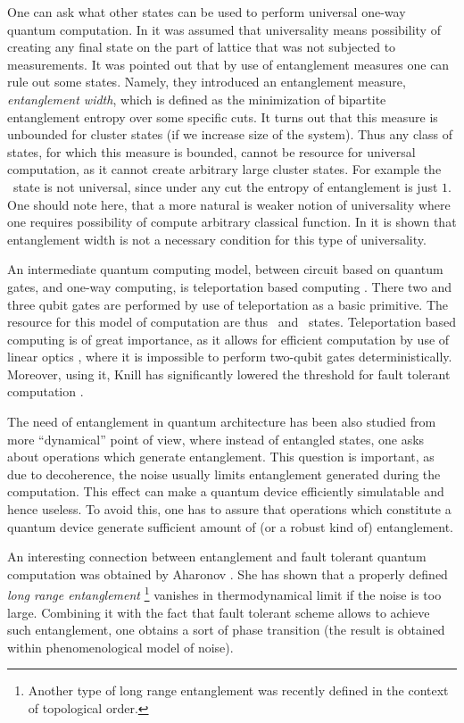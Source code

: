 \documentclass[rmp,12pt,preprint]{revtex4-2}
\begin{document}
One can ask what other states can be used to perform universal
one-way quantum computation. In \cite{NestMDB2006-one-way-resource}
it was assumed that universality means possibility
of creating any final state on the part of lattice that
was not subjected to measurements.
It was pointed out that by use of entanglement measures one can
rule out some states. Namely, they introduced an entanglement
measure, {\it entanglement width}, which is defined as the
minimization of bipartite entanglement entropy over some specific
cuts. It turns out that this measure is unbounded for cluster states
(if we increase size of the system). Thus any class of
states, for which this measure is bounded, cannot be resource for
universal computation, as it cannot create arbitrary large cluster
states. For example the \ghz\ state is not universal, since under
any cut the entropy of entanglement is just $1$.
One should note here, that a more natural is weaker notion of universality
where one requires possibility of compute arbitrary classical function. In \cite{GrossE2006-one-way}
it is shown that entanglement width is not a necessary condition
for this type of universality.

An intermediate quantum computing model, between circuit based on
quantum gates, and one-way computing, is teleportation based
computing \cite{GottesmanC1999-Knill}. There two and three
qubit gates are performed by use of teleportation as a basic
primitive. The resource for this model of computation are thus
\eprstates\ and \ghz\ states. Teleportation based computing is of
great importance, as it allows for efficient computation by use of
linear optics \cite{KnillLM2001-lin-opt}, where it is impossible to
perform two-qubit gates
deterministically. Moreover, using it, Knill has significantly
lowered the threshold for fault tolerant computation
\cite{Knill-FT}.

The need of entanglement in quantum architecture has been also studied
from more ``dynamical'' point of view, where instead of entangled
states, one asks about operations which generate entanglement. This
question is important, as due to decoherence, the noise usually limits
entanglement generated during the computation. This effect can make a
quantum device efficiently simulatable and hence useless. To avoid
this, one has to assure that operations which constitute a quantum
device generate sufficient amount of (or a robust kind of)
entanglement.

An interesting connection between entanglement and fault tolerant quantum computation was obtained by Aharonov \cite{dorit-phase}.
She has shown that a properly defined {\it long range entanglement}
\footnote{Another type of long range entanglement was recently defined
\cite{KitaevP2005-top-ent,LevinW2006-top-entr} in the context of topological
order.} vanishes in
thermodynamical limit if the noise is too large. Combining it with the fact that
fault tolerant scheme allows to achieve such entanglement, one obtains a
sort of phase transition (the result is obtained within
phenomenological model of noise).
\end{document}
